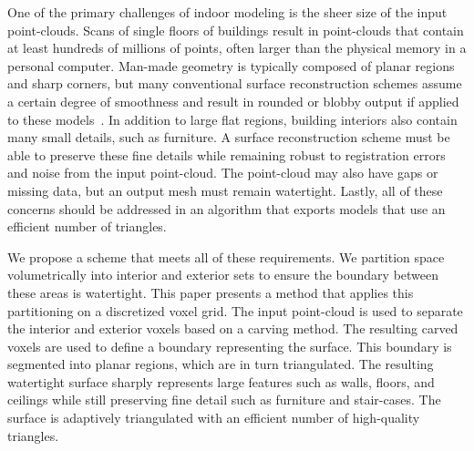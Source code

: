 \documentclass[10pt,twocolumn,letterpaper]{article}
\begin{document}
One of the primary challenges of indoor modeling is the sheer size of the input point-clouds.  Scans of single floors of buildings result in point-clouds that contain at least hundreds of millions of points, often larger than the physical memory in a personal computer.  Man-made geometry is typically composed of planar regions and sharp corners, but many conventional surface reconstruction schemes assume a certain degree of smoothness and result in rounded or blobby output if applied to these models~\cite{Powercrust,OctreeSculpting,Carving,ProgressiveMesh,Poisson,Eigencrust}.  In addition to large flat regions, building interiors also contain many small details, such as furniture.  A surface reconstruction scheme must be able to preserve these fine details while remaining robust to registration errors and noise from the input point-cloud.  The point-cloud may also have gaps or missing data, but an output mesh must remain watertight.  Lastly, all of these concerns should be addressed in an algorithm that exports models that use an efficient number of triangles.




We propose a scheme that meets all of these requirements.  We partition space volumetrically into interior and exterior sets to ensure the boundary between these areas is watertight.  This paper presents a method that applies this partitioning on a discretized voxel grid.  The input point-cloud is used to separate the interior and exterior voxels based on a carving method.  The resulting carved voxels are used to define a boundary representing the surface.  This boundary is segmented into planar regions, which are in turn triangulated.  The resulting watertight surface sharply represents large features such as walls, floors, and ceilings while still preserving fine detail such as furniture and stair-cases.  The surface is adaptively triangulated with an efficient number of high-quality triangles.
\end{document}

